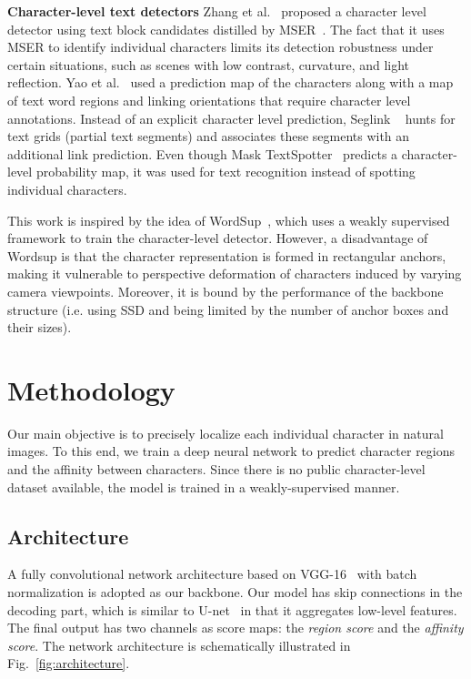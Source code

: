 \documentclass[10pt,twocolumn,letterpaper]{article}
\begin{document}
{\bf Character-level text detectors } Zhang et al.~\cite{zhang2016multi} proposed a character level detector using text block candidates distilled by MSER~\cite{matas2004robust}. The fact that it uses MSER to identify individual characters limits its detection robustness under certain situations, such as scenes with low contrast, curvature, and light reflection. 
Yao et al.~\cite{yao2016scene} used a prediction map of the characters along with a map of text word regions and linking orientations that require character level annotations. 
Instead of an explicit character level prediction, Seglink ~\cite{shi2017detecting} hunts for text grids (partial text segments) and associates these segments with an additional link prediction.
Even though Mask TextSpotter~\cite{lyu2018mask} predicts a character-level probability map, it was used for text recognition instead of spotting individual characters.

This work is inspired by the idea of WordSup~\cite{hu2017wordsup}, which uses a weakly supervised framework to train the character-level detector. However, a disadvantage of Wordsup is that the character representation is formed in rectangular anchors, making it vulnerable to perspective deformation of characters induced by varying camera viewpoints. Moreover, it is bound by the performance of the backbone structure (i.e. using SSD and being limited by the number of anchor boxes and their sizes).









 \section{Methodology}

Our main objective is to precisely localize each individual character in natural images. To this end, we train a deep neural network to predict character regions and the affinity between characters. Since there is no public character-level dataset available, the model is trained in a weakly-supervised manner.

\subsection{Architecture}
A fully convolutional network architecture based on VGG-16~\cite{simonyan2014very} with batch normalization is adopted as our backbone. Our model has skip connections in the decoding part, which is similar to U-net~\cite{ronneberger2015u} in that it aggregates low-level features. The final output has two channels as score maps: the \textit{region score} and the \textit{affinity score}.
The network architecture is schematically illustrated in Fig.~\ref{fig:architecture}.
\end{document}
